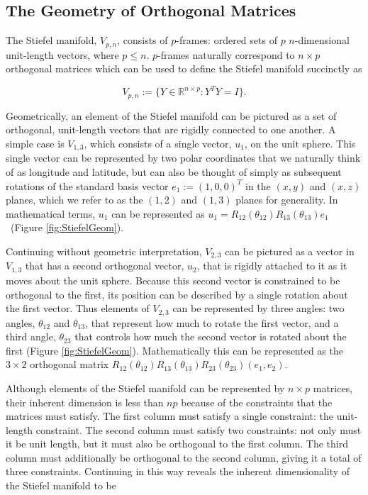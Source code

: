 \documentclass[ba]{imsart}
\numberwithin{equation}{section}
\theoremstyle{plain}
\begin{document}
\subsection{The Geometry of Orthogonal Matrices}
The Stiefel manifold, $V_{p,n}$,  consists of $p$-frames: ordered sets of $p$ $n$-dimensional unit-length vectors, where $p \le n$. $p$-frames naturally correspond to $n \times p$ orthogonal matrices which can be used to define the Stiefel manifold succinctly as

\begin{equation}
V_{p,n} := \{Y \in \mathbb{R}^{n \times p}: Y^TY = I \}.
\end{equation}

\noindent Geometrically, an element of the Stiefel manifold can be pictured as a set of orthogonal, unit-length vectors that are rigidly connected to one another. A simple case is $V_{1,3}$, which consists of a single vector, $u_1$, on the unit sphere. This single vector can be represented by two polar coordinates that we naturally think of as longitude and latitude, but can also be thought of simply as subsequent rotations of the standard basis vector $e_1 := (1,0,0)^T$ in the $(x,y)$ and $(x,z)$ planes, which we refer to as the $(1,2)$ and $(1,3)$ planes for generality. In mathematical terms, $u_1$ can be represented as $u_1 = R_{12}(\theta_{12}) R_{13}(\theta_{13}) e_1$~(Figure \ref{fig:StiefelGeom}). 

\noindent Continuing without geometric interpretation, $V_{2,3}$ can be pictured as a vector in $V_{1,3}$ that has a second orthogonal vector, $u_2$, that is rigidly attached to it as it moves about the unit sphere. Because this second vector is constrained to be orthogonal to the first, its position can be described by a single rotation about the first vector. Thus elements of $V_{2,3}$ can be represented by three angles: two angles, $\theta_{12}$ and $\theta_{13}$, that represent how much to rotate the first vector, and a third angle, $\theta_{23}$ that controls how much the second vector is rotated about the first (Figure \ref{fig:StiefelGeom}). Mathematically this can be represented as the $3 \times 2$ orthogonal matrix $R_{12}(\theta_{12}) R_{13}(\theta_{13}) R_{23}(\theta_{23}) (e_1, e_2)$.

\noindent Although elements of the Stiefel manifold can be represented by $n \times p$ matrices, their inherent dimension is less than $np$ because of the constraints that the matrices must satisfy. The first column must satisfy a single constraint: the unit-length constraint. The second column must satisfy two constraints: not only must it be unit length, but it must also be orthogonal to the first column. The third column must additionally be orthogonal to the second column, giving it a total of three constraints. Continuing in this way reveals the inherent dimensionality of the Stiefel manifold to be
\end{document}
